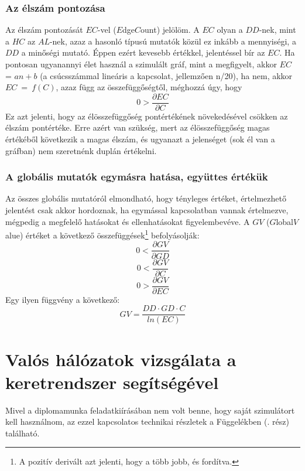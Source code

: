    \subsubsection{Az élszám pontozása}
    Az élszám pontozását $EC$-vel ($E$dge$C$ount) jelölöm. A $EC$ olyan a $DD$-nek, mint a $HC$ az $AL$-nek, azaz a hasonló típusú mutatók közül ez inkább a mennyiségi, a $DD$ a minőségi mutató. Éppen ezért kevesebb értékkel, jelentéssel bír az $EC$. Ha pontosan ugyanannyi élet használ a szimulált gráf, mint a megfigyelt, akkor $EC$ = $an + b$ (a csúcsszámmal lineáris a kapcsolat, jellemzően n/20), ha nem, akkor $EC~=~f(C)$, azaz függ az összefüggőségtől, méghozzá úgy, hogy
    $$0 > \frac{\partial EC}{\partial C}$$
    Ez azt jelenti, hogy az élösszefüggőség pontértékének növekedésével csökken az élszám pontértéke. Erre azért van szükség, mert az élösszefüggőség magas értékéből következik a magas élszám, és ugyanazt a jelenséget (sok él van a gráfban) nem szeretnénk duplán értékelni.

    \subsubsection{A globális mutatók egymásra hatása, együttes értékük}
    Az összes globális mutatóról elmondható, hogy tényleges értéket, értelmezhető jelentést csak akkor hordoznak, ha egymással kapcsolatban vannak értelmezve, mégpedig a megfelelő hatásokat és ellenhatásokat figyelembevéve. A $GV$ ($G$lobal$V$alue) értéket a következő összefüggések\footnote{A pozitív derivált azt jelenti, hogy a több jobb, és fordítva.} befolyásolják:
    $$0 < \frac{\partial GV}{\partial GD}$$
    $$0 < \frac{\partial GV}{\partial C}$$
    $$0 > \frac{\partial GV}{\partial EC}$$
    Egy ilyen függvény a következő:
    $$GV = \frac{DD \cdot GD \cdot C}{ln(EC)}$$

  \section{Valós hálózatok vizsgálata a keretrendszer segítségével}\label{section_real}
  Mivel a diplomamunka feladatkiírásában nem volt benne, hogy saját szimulátort kell használnom, az ezzel kapcsolatos technikai részletek a Függelékben (. rész) található.\\

